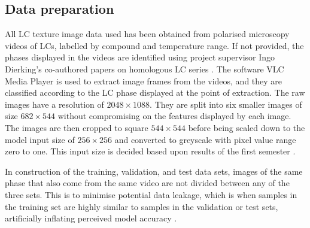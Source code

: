 \documentclass[12pt]{article}
\begin{document}
\subsection{Data preparation}
All LC texture image data used has been obtained from polarised microscopy videos of LCs, labelled by compound and temperature range. If not provided, the phases displayed in the videos are identified using project supervisor Ingo Dierking's co-authored papers on homologous LC series \cite{Dierking94, Schacht95}. The software VLC Media Player \cite{VideoLan06} is used to extract image frames from the videos, and they are classified  according to the LC phase displayed at the point of extraction. The raw images have a resolution of $2048\times1088$. They are split into six smaller images of size $682\times544$ without compromising on the features displayed by each image. The images are then cropped to square $544\times544$ before being scaled down to the model input size of $256\times256$ and converted to greyscale with pixel value range zero to one. This input size is decided based upon results of the first semester \cite{Heaton20}.

In construction of the training, validation, and test data sets, images of the same phase that also come from the same video are not divided between any of the three sets. This is to minimise potential data leakage, which is when samples in the training set are highly similar to samples in the validation or test sets, artificially inflating perceived model accuracy \cite{Kaufman12}.
\end{document}
